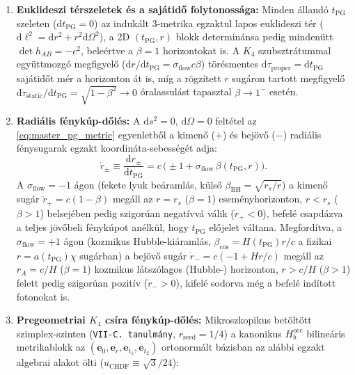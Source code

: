 \documentclass[11pt,a4paper]{article}
\theoremstyle{remark}
\begin{document}
\begin{enumerate}
  \item \textbf{Euklideszi t\'erszeletek \'es a saj\'atid\H{o} folytonoss\'aga:} Minden \'alland\'o $t_{\mathrm{PG}}$ szeleten ($\mathrm{d}t_{\mathrm{PG}} = 0$) az induk\'alt 3-metrika egzaktul lapos euklideszi t\'er ($\mathrm{d}\ell^2 = \mathrm{d}r^2 + r^2\mathrm{d}\Omega^2$), a 2D $(t_{\mathrm{PG}}, r)$ blokk determin\'ansa pedig minden\"utt $\det h_{AB} = -c^2$, bele\'ertve a $\beta = 1$ horizontokat is. A $K_4$ szubsztr\'atummal egy\"uttmozg\'o megfigyel\H{o} ($\mathrm{d}r/\mathrm{d}t_{\mathrm{PG}} = \sigma_{\mathrm{flow}} c\beta$) t\"or\'esmentes $\mathrm{d}\tau_{\mathrm{proper}} = \mathrm{d}t_{\mathrm{PG}}$ saj\'atid\H{o}t m\'er a horizonton \'at is, m\'ig a r\"ogz\'itett $r$ sug\'aron tartott megfigyel\H{o} $\mathrm{d}\tau_{\mathrm{static}}/\mathrm{d}t_{\mathrm{PG}} = \sqrt{1 - \beta^2} \to 0$ \'oralassul\'ast tapasztal $\beta \to 1^-$ eset\'en.
  \item \textbf{Radi\'alis f\'enyk\'up-d\H{o}l\'es:} A $\mathrm{d}s^2 = 0$, $\mathrm{d}\Omega = 0$ felt\'etel az \eqref{eq:master_pg_metric} egyenletb\H{o}l a kimen\H{o} ($+$) \'es bej\"ov\H{o} ($-$) radi\'alis f\'enysugarak egzakt koordin\'ata-sebess\'eg\'et adja:
  \begin{equation}
    \dot{r}_\pm \equiv \frac{\mathrm{d}r_\pm}{\mathrm{d}t_{\mathrm{PG}}} = c\,\bigl(\pm 1 + \sigma_{\mathrm{flow}}\,\beta(t_{\mathrm{PG}}, r)\bigr).
    \label{eq:null_speeds}
  \end{equation}
  A $\sigma_{\mathrm{flow}} = -1$ \'agon (fekete lyuk be\'araml\'as, k\"uls\H{o} $\beta_{\mathrm{BH}} = \sqrt{r_s/r}$) a kimen\H{o} sug\'ar $\dot{r}_+ = c(1 - \beta)$ meg\'all az $r = r_s$ ($\beta = 1$) esem\'enyhorizonton, $r < r_s$ ($\beta > 1$) belsej\'eben pedig szigor\'uan negat\'ivv\'a v\'alik ($\dot{r}_+ < 0$), befel\'e csapd\'azva a teljes j\"ov\H{o}beli f\'enyk\'upot an\'elk\"ul, hogy $t_{\mathrm{PG}}$ el\H{o}jelet v\'altana. Megford\'itva, a $\sigma_{\mathrm{flow}} = +1$ \'agon (kozmikus Hubble-ki\'araml\'as, $\beta_{\mathrm{cos}} = H(t_{\mathrm{PG}})r/c$ a fizikai $r = a(t_{\mathrm{PG}})\chi$ sug\'arban) a bej\"ov\H{o} sug\'ar $\dot{r}_- = c(-1 + Hr/c)$ meg\'all az $r_A = c/H$ ($\beta = 1$) kozmikus l\'atsz\'olagos (Hubble-) horizonton, $r > c/H$ ($\beta > 1$) felett pedig szigor\'uan pozit\'iv ($\dot{r}_- > 0$), kifel\'e sodorva m\'eg a befel\'e ind\'itott fotonokat is.
  \item \textbf{Pregeometriai $K_4$ cs\'ira f\'enyk\'up-d\H{o}l\'es:} Mikroszkopikus bet\"olt\"ott szimplex-szinten (\texttt{VII-C.\ tanulm\'any}, $r_{\mathrm{seed}} = 1/4$) a kanonikus $H_b^{\mathrm{occ}}$ biline\'aris metrikablokk az $(\mathbf{e}_0, \mathbf{e}_r, \mathbf{e}_{t_1}, \mathbf{e}_{t_2})$ ortonorm\'alt b\'azisban az al\'abbi egzakt algebrai alakot \"olti ($u_{\mathrm{CHDF}} \equiv \sqrt{3}/24$):

\end{enumerate}
\end{document}
